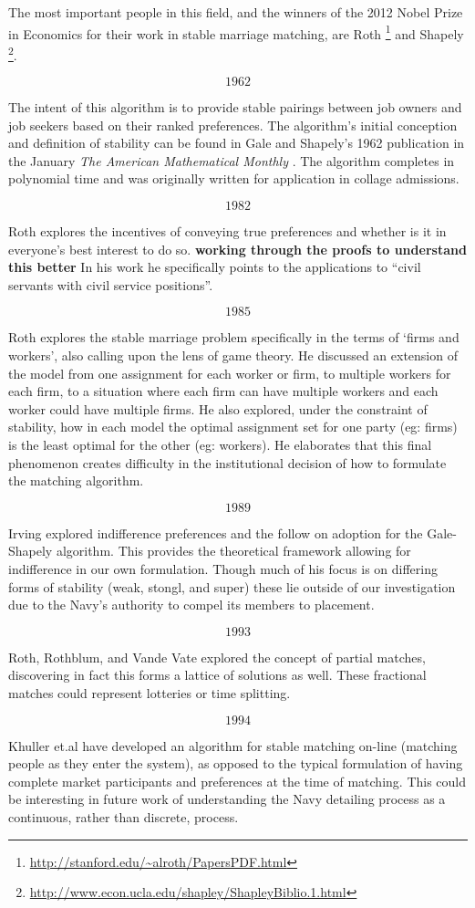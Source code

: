 The most important people in this field, and the winners of the 2012 Nobel Prize in Economics for their work in stable marriage matching, are Roth \footnote{\url{http://stanford.edu/~alroth/PapersPDF.html}} and Shapely \footnote{\url{http://www.econ.ucla.edu/shapley/ShapleyBiblio.1.html}}.

\[1962\]

The intent of this algorithm is to provide stable pairings between job owners and job seekers based on their ranked preferences. The algorithm's initial conception and definition of stability can be found in Gale and Shapely's 1962 publication in the January \textit{The American Mathematical Monthly} \cite{1962_Gale}. The algorithm completes in polynomial time and was originally written for application in collage admissions.

\[1982\]

Roth explores the incentives of conveying true preferences and whether is it in everyone's best interest to do so. \cite{1982_Roth} \textbf{working through the proofs to understand this better} In his work he specifically points to the applications to ``civil servants with civil service positions''.

\[1985\]

Roth explores the stable marriage problem specifically in the terms of `firms and workers', also calling upon the lens of game theory.\cite{1985_Roth} He discussed an extension of the model from one assignment for each worker or firm, to multiple workers for each firm, to a situation where each firm can have multiple workers and each worker could have multiple firms. He also explored, under the constraint of stability, how in each model the optimal assignment set for one party (eg: firms) is the least optimal for the other (eg: workers). He elaborates that this final phenomenon creates difficulty in the institutional decision of how to formulate the matching algorithm.

\[1989\]

Irving explored indifference preferences and the follow on adoption for the Gale-Shapely algorithm. \cite{1989_Irving} This provides the theoretical framework allowing for indifference in our own formulation. Though much of his focus is on differing forms of stability (weak, stongl, and super) these lie outside of our investigation due to the Navy's authority to compel its members to placement.

\[1993\]

Roth, Rothblum, and Vande Vate explored the concept of partial matches, discovering in fact this forms a lattice of solutions as well. These fractional matches could represent lotteries or time splitting. \cite{1993_Roth}

\[1994\]

Khuller et.al have developed an algorithm for stable matching on-line (matching people as they enter the system), as opposed to the typical formulation of having complete market participants and preferences at the time of matching. \cite{1994_Khuller} This could be interesting in future work of understanding the Navy detailing process as a continuous, rather than discrete, process.